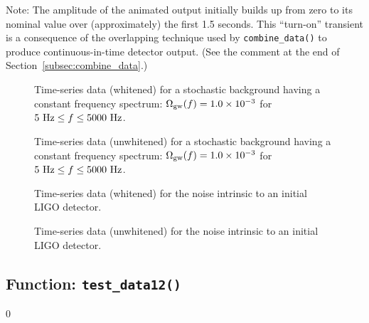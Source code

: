 Note: The amplitude of the animated output initially builds up from zero 
to its nominal value over (approximately) the first 1.5 seconds.
This ``turn-on'' transient is a consequence of the overlapping technique
used by {\tt combine\_data()} to produce continuous-in-time detector output.
(See the comment at the end of Section~\ref{subsec:combine_data}.)


\begin{figure}[h]
\begin{center}
{}
\caption{\label{f:f2a} 
Time-series data (whitened) for a stochastic background having a 
constant frequency spectrum:
$\Omega_{\rm gw}(f)=1.0\times 10^{-3}$ for $5\ {\rm Hz}\le f\le 5000\ {\rm Hz}$.}
\end{center}
\end{figure}

\begin{figure}[h]
\begin{center}
{}
\caption{\label{f:f2b} 
Time-series data (unwhitened) for a stochastic background having a 
constant frequency spectrum:
$\Omega_{\rm gw}(f)=1.0\times 10^{-3}$ for $5\ {\rm Hz}\le f\le 5000\ {\rm Hz}$.}
\end{center}
\end{figure}

\begin{figure}[h]
\begin{center}
{}
\caption{\label{f:f2c} 
Time-series data (whitened) for the noise intrinsic to an initial 
LIGO detector.}
\end{center}
\end{figure}

\begin{figure}[h]
\begin{center}
{}
\caption{\label{f:f2d} 
Time-series data (unwhitened) for the noise intrinsic to an initial 
LIGO detector.}
\end{center}
\end{figure}

\clearpage

\subsection{Function: {\tt test\_data12()}}
\label{subsec:test_data12}
\setcounter{equation}0

